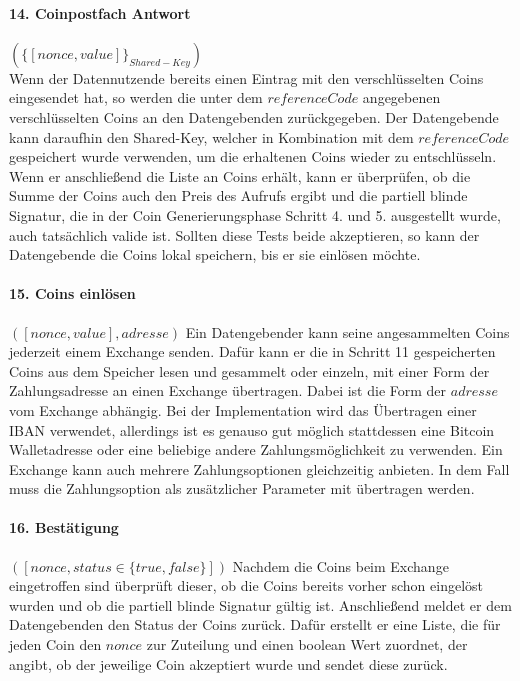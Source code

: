 \documentclass{scrreprt}
\begin{document}
\paragraph{14. Coinpostfach Antwort} $(\{[nonce,value]\}_{Shared-Key})$\\
Wenn der Datennutzende bereits einen Eintrag mit den verschlüsselten Coins eingesendet hat, so werden die unter dem $referenceCode$ angegebenen verschlüsselten Coins an den Datengebenden zurückgegeben. Der Datengebende kann daraufhin den Shared-Key, welcher in Kombination mit dem $referenceCode$ gespeichert wurde verwenden, um die erhaltenen Coins wieder zu entschlüsseln. Wenn er anschließend die Liste an Coins erhält, kann er überprüfen, ob die Summe der Coins auch den Preis des Aufrufs ergibt und die partiell blinde Signatur, die in der Coin Generierungsphase Schritt 4. und 5. ausgestellt wurde, auch tatsächlich valide ist. Sollten diese Tests beide akzeptieren, so kann der Datengebende die Coins lokal speichern, bis er sie einlösen möchte.

\paragraph{15. Coins einlösen} $([nonce,value], adresse)$
Ein Datengebender kann seine angesammelten Coins jederzeit einem Exchange senden. Dafür kann er die in Schritt 11 gespeicherten Coins aus dem Speicher lesen und gesammelt oder einzeln, mit einer Form der Zahlungsadresse an einen Exchange übertragen. Dabei ist die Form der $adresse$ vom Exchange abhängig. Bei der Implementation wird das Übertragen einer IBAN verwendet, allerdings ist es genauso gut möglich stattdessen eine Bitcoin Walletadresse oder eine beliebige andere Zahlungsmöglichkeit zu verwenden. Ein Exchange kann auch mehrere Zahlungsoptionen gleichzeitig anbieten. In dem Fall muss die Zahlungsoption als zusätzlicher Parameter mit übertragen werden.

\paragraph{16. Bestätigung} $([nonce, status \in \{true, false\}])$
Nachdem die Coins beim Exchange eingetroffen sind überprüft dieser, ob die Coins bereits vorher schon eingelöst wurden und ob die partiell blinde Signatur gültig ist. Anschließend meldet er dem Datengebenden den Status der Coins zurück. Dafür erstellt er eine Liste, die für jeden Coin den $nonce$ zur Zuteilung und einen boolean Wert zuordnet, der angibt, ob der jeweilige Coin akzeptiert wurde und sendet diese zurück.
\end{document}
